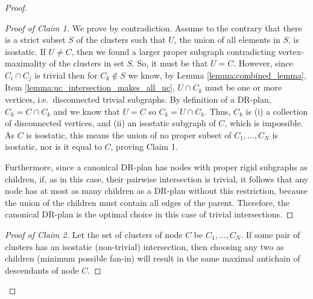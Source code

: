 \begin{proof}
\begin{proof}[Proof of Claim 1]
        We prove by contradiction.
        Assume to the contrary that there is a strict subset $S$ of the clusters such that $U$, the union of all elements in $S$, is isostatic. If $U\neq C$, then we found a larger proper subgraph contradicting vertex-maximality of the clusters in set $S$. So, it must be that $U=C$.
        \usestwod
        However, since $C_i \cap C_j$ is trivial then for $C_k\notin S$ we know, by Lemma \ref{lemma:combined_lemma}, Item \ref{lemma:uc_intersection_makes_all_uc}, $U\cap C_k$ must be one or more vertices, i.e.\ disconnected trivial subgraphs. By definition of a DR-plan, $C_k=C\cap C_k$ and we know that $U=C$ so $C_k=U\cap C_k$. Thus, $C_k$ is (i) a collection of disconnected vertices, and (ii) an isostatic subgraph of $C$, which is impossible. As $C$ is isostatic, this means the union of no proper subset of $C_1,\ldots,C_N$ is isostatic, nor is it equal to $C$, proving Claim 1.

        Furthermore, since a canonical DR-plan has nodes with proper rigid  subgraphs as children, if, as in this case, their pairwise intersection is trivial, it follows that any node has at most as many children as a DR-plan without this restriction, because the union of the children must contain all edges of the parent. Therefore, the canonical DR-plan is the optimal choice in this case of trivial intersections.
    \end{proof}


    \begin{proof}[Proof of Claim 2]
        Let the set of clusters of node $C$ be $C_1,\ldots,C_N$. If some pair of clusters
        has an isostatic (non-trivial) intersection, then choosing any two as children (minimum possible fan-in) will result in the same maximal antichain of descendants of node $C$.


\end{proof}
\end{proof}
